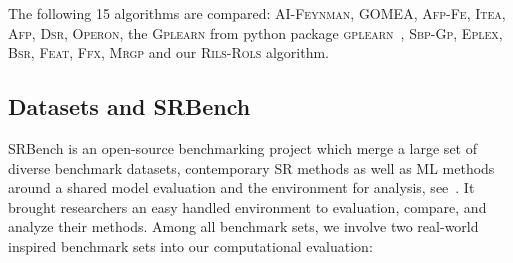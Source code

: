 \documentclass[a4paper,12pt]{elsarticle}
\begin{document}
The following 15 algorithms are compared: \textsc{AI-Feynman}, \textsc{GOMEA}, \textsc{Afp-Fe}, \textsc{Itea}, \textsc{Afp}, \textsc{Dsr}, \textsc{Operon}, the \textsc{Gplearn} from python package \textsc{gplearn}~\cite{stephens2016genetic}, \textsc{Sbp-Gp}, \textsc{Eplex}, \textsc{Bsr}, \textsc{Feat}, \textsc{Ffx}, \textsc{Mrgp} and our \textsc{Rils}-\textsc{Rols} algorithm.


 
\subsection{Datasets and SRBench}

SRBench is an open-source benchmarking project which merge a large set of diverse benchmark datasets, contemporary SR methods as well as ML methods around a shared model evaluation and the environment for analysis, see~\cite{la2021contemporary}. It brought researchers an easy handled environment to evaluation, compare, and analyze their methods. Among all benchmark sets, we involve two real-world inspired benchmark sets into our computational evaluation: 
\end{document}
